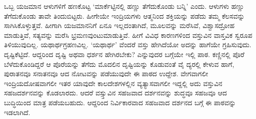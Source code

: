 ಒಬ್ಬ ಯಜಮಾನ ಆಳುಗಳಿಗೆ ಹಣಕೊಟ್ಟ `ಮಾರ್ಕೆಟ್ಟಿನಲ್ಲಿ ಹಣ್ಣು  ತೆಗೆದುಕೊಂಡು ಬನ್ನಿ' ಎಂದು. ಆಳುಗಳು ಹಣ್ಣು ತೆಗೆದುಕೊಂಡು ತಾವೇ ತಿಂದುಬಿಟ್ಟರು. ಹೀಗೇಯೇ ಇಂದ್ರಿಯಗಳು ಆತ್ಮನಿಂದ ಶಕ್ತಿಯನ್ನು ಪಡೆದು ತಮ್ಮ ಕೆಲಸವನ್ನು ಸಾಗಿಸಿಕೊಳ್ಳುತ್ತವೆ. ಹೀಗಾಗಿ ಯಜಮಾನನಿಗೆ ಏನೂ ಇಲ್ಲದಂತಾಗಿದೆ, ಮೂಲವನ್ನು ಮರೆಸಿವೆ, ವಿಶ್ವಾಸದ್ರೋಹ ಮಾಡುತ್ತಿವೆ, ಸತ್ಯವನ್ನು ಮರೆಸಿ ಭ್ರಮಣವುಂಟುಮಾಡುತ್ತಿವೆ. ಹೀಗೆ ವಿವಿಧ ಕಾರಣಗಳಿಂದ ವಸ್ತುವಿನ ವಾಸ್ತವಿಕ ಸ್ವರೂಪ ತಿಳಿಯುವುದಿಲ್ಲ. ಯಥಾರ್ಥಗ್ರಹಣವಿಲ್ಲ. `ಯಥಾರ್ಥ' ವೆಂದರೆ ವಸ್ತು ಹೇಗಿದೆಯೋ ಅದನ್ನು ಹಾಗೆಯೇ ಗ್ರಹಿಸುವುದು. ದೃಷ್ಟಿಕೆಟ್ಟಿದೆ. ಆದ್ದರಿಂದ ದೃಷ್ಟಿ ಅಥವಾ ಧರ್ಶನ ಹೇಗಿರಬೇಕು? ಎನ್ನುವುದರ ಬಗ್ಗೆಯೇ ಇಲ್ಲಿ ಪಾಠ. ಕಣ್ಣಿನಲ್ಲಿ ಪೊರೆ ಬೆಳೆದುಕೊಂಡಿದ್ದರೆ ಆ ಪೊರೆಯನ್ನು ತೆಗೆದು ಮೊದಲಿನ ದೃಷ್ಟಿಯನ್ನು ಕೊಡುವಂತೆ  ವೈ ದ್ಯರಲ್ಲಿ ಕೇಳುವ ಹಾಗೆ, ಪುರಾತನವೂ ಸನಾತನವೂ ಆದ ನೋಟವನ್ನು ಪಡೆಯುವುದೇ ಈ ಪಾಠದ ಉದ್ದೇಶ. ವೇಗವಾಗಲೀ ಇಂದ್ರಿಯದೋಷವಾಗಲೀ ಇತರ ಯಾವುದೇ ಕಾಲದೇಶಗಳಲ್ಲಿನ ವ್ಯತ್ಯಾಸವಾಗಲೀ ಇದ್ದಲ್ಲಿ ಅದು ವಸ್ತುವಿನ ಸಹಜದರ್ಶನವನ್ನು ಕೊಡಲಾರದು. ಆದರೆ ವಸ್ಸ್ತುವಿನ ಸಹಜವಾದ ದರ್ಶನವನ್ನು ಶುದ್ಧವೂ ಸಹಜವೂ ಆದ ಬುದ್ಧಿಯಿಂದ ಮಾತ್ರ ಪಡೆಯಬಹುದು. ಆದ್ದರಿಂದ ನಿರ್ವಿಕಾರವಾದ ಸಹಜವಾದ  ದರ್ಶನದ ಬಗ್ಗೆ ಈ ಪಾಠವನ್ನು ಇಡಲಾಗಿದೆ.
  

